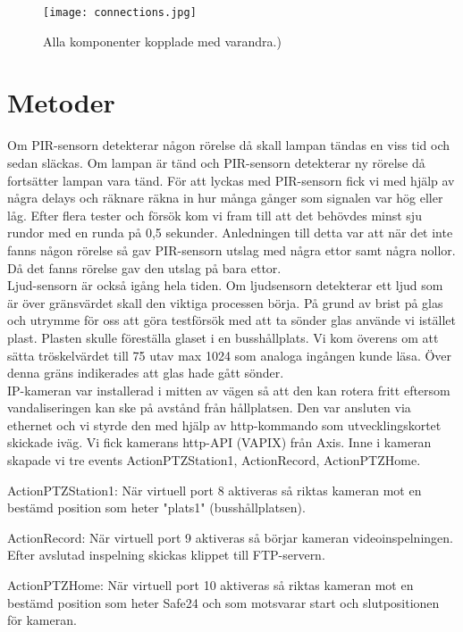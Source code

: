 \begin{figure}[h]

  \texttt{[image: connections.jpg]}
  \caption{Alla komponenter kopplade med varandra.)}
  \label{fig:connections}
\end{figure}
\clearpage



\section{Metoder} 
Om PIR-sensorn detekterar någon rörelse då skall lampan tändas en viss tid och sedan släckas. Om lampan är tänd och PIR-sensorn detekterar ny rörelse då fortsätter lampan vara tänd. För att lyckas med PIR-sensorn fick vi med hjälp av några delays och räknare räkna in hur många gånger som signalen var hög eller låg. Efter flera tester och försök kom vi fram till att det behövdes minst sju rundor med en runda på 0,5 sekunder. Anledningen till detta var att när det inte fanns någon rörelse så gav PIR-sensorn utslag med några ettor samt några nollor. Då det fanns rörelse gav den utslag på bara ettor.\\

 Ljud-sensorn är också igång hela tiden. Om ljudsensorn detekterar ett ljud som är över gränsvärdet skall den viktiga processen börja. På grund av brist på glas och utrymme för oss att göra testförsök med att ta sönder glas använde vi istället plast. Plasten skulle föreställa glaset i en busshållplats. Vi kom överens om att sätta tröskelvärdet till 75 utav max 1024 som analoga ingången kunde läsa. Över denna gräns indikerades att glas hade gått sönder.\\

IP-kameran var installerad i mitten av vägen så att den kan rotera fritt eftersom vandaliseringen kan ske på avstånd från hållplatsen. Den var ansluten via ethernet och vi styrde den med hjälp av http-kommando som utvecklingskortet skickade iväg. Vi fick kamerans http-API (VAPIX) från Axis. Inne i kameran skapade vi tre events ActionPTZStation1, ActionRecord, ActionPTZHome.

ActionPTZStation1: När virtuell port 8 aktiveras så riktas kameran mot en bestämd position som  heter "plats1" (busshållplatsen).

ActionRecord: När virtuell port 9 aktiveras så börjar kameran videoinspelningen. Efter avslutad inspelning skickas klippet till FTP-servern.

ActionPTZHome: När virtuell port 10 aktiveras så riktas kameran mot en bestämd position som heter Safe24 och som motsvarar start och slutpositionen för kameran.\\

